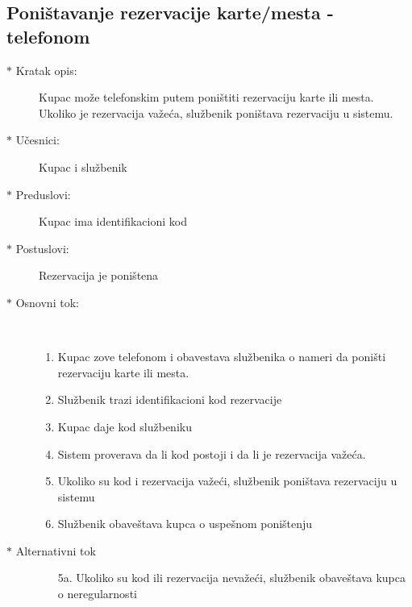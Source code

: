 \subsection{Poni\v stavanje rezervacije karte/mesta - telefonom}
\begin{description}
  \item[$\ast$ Kratak opis: ] Kupac mo\v ze telefonskim putem poni\v stiti rezervaciju karte ili mesta. Ukoliko je rezervacija va\v ze\'ca, slu\v zbenik poni\v stava rezervaciju u sistemu.
  \item[$\ast$ U\v cesnici: ] Kupac i slu\v zbenik
  \item[$\ast$ Preduslovi: ] Kupac ima identifikacioni kod
  \item[$\ast$ Postuslovi: ] Rezervacija je poni\v stena
  \item[$\ast$ Osnovni tok: ] \ \\
  \begin{enumerate}
    \item Kupac zove telefonom i obavestava slu\v zbenika o nameri da poni\v sti
	   rezervaciju karte ili mesta.
    \item Slu\v zbenik trazi identifikacioni kod rezervacije
    \item Kupac daje kod slu\v zbeniku
    \item Sistem proverava da li kod postoji i da li je rezervacija va\v ze\'ca.
    \item Ukoliko su kod i rezervacija va\v ze\'ci, slu\v zbenik poni\v stava 
	   rezervaciju u sistemu
    \item Slu\v zbenik obave\v stava kupca o uspe\v snom poni\v stenju
  \end{enumerate}
  \item[$\ast$ Alternativni tok]
  \begin{enumerate}
    \item[5a. ]  Ukoliko su kod ili rezervacija neva\v ze\'ci, slu\v zbenik obave\v stava kupca o 
		neregularnosti
  \end{enumerate}
  
\end{description}

